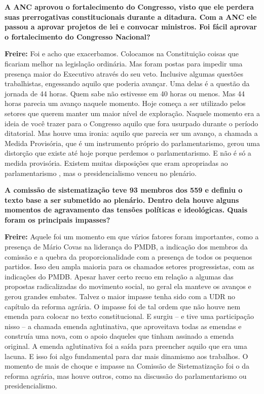 \textbf{A ANC aprovou o fortalecimento do Congresso, visto que ele
perdera suas prerrogativas constitucionais durante a ditadura. Com a ANC
ele passou a aprovar projetos de lei e convocar ministros. Foi fácil
aprovar o fortalecimento do Congresso Nacional?}

\textbf{Freire:} Foi e acho que exacerbamos. Colocamos na Constituição
coisas que ficariam melhor na legislação ordinária. Mas foram postas
para impedir uma presença maior do Executivo através do seu veto.
Inclusive algumas questões trabalhistas, engessando aquilo que poderia
avançar. Uma delas é a questão da jornada de 44 horas. Quem sabe não
estivesse em 40 horas ou menos. Mas 44 horas parecia um avanço naquele
momento. Hoje começa a ser utilizado pelos setores que querem manter um
maior nível de exploração. Naquele momento era a ideia de você trazer
para o Congresso aquilo que fora usurpado durante o período ditatorial.
Mas houve uma ironia: aquilo que parecia ser um avanço, a chamada a
Medida Provisória, que é um instrumento próprio do parlamentarismo,
gerou uma distorção que existe até hoje porque perdemos o
parlamentarismo. E não é só a medida provisória. Existem muitas
disposições que eram apropriadas ao parlamentarismo , mas o
presidencialismo venceu no plenário.

\textbf{A comissão de sistematização teve 93 membros dos 559 e definiu o
texto base a ser submetido ao plenário. Dentro dela houve alguns
momentos de agravamento das tensões políticas e ideológicas. Quais foram
os principais impasses?}

\textbf{Freire:} Aquele foi um momento em que vários fatores foram
importantes, como a presença de Mário Covas na liderança do PMDB, a
indicação dos membros da comissão e a quebra da proporcionalidade com a
presença de todos os pequenos partidos. Isso deu ampla maioria para os
chamados setores progressistas, com as indicações do PMDB. Apesar haver
certo recuo em relação a algumas das propostas radicalizadas do
movimento social, no geral ela manteve os avanços e gerou grandes
embates. Talvez o maior impasse tenha sido com a UDR no capítulo da
reforma agrária. O impasse foi de tal ordem que não houve nem emenda
para colocar no texto constitucional. E surgiu -- e tive uma
participação nisso -- a chamada emenda aglutinativa, que aproveitava
todas as emendas e construía uma nova, com o apoio daqueles que tinham
assinado a emenda original. A emenda aglutinativa foi a saída para
preencher aquilo que era uma lacuna. E isso foi algo fundamental para
dar mais dinamismo aos trabalhos. O momento de mais de choque e impasse
na Comissão de Sistematização foi o da reforma agrária, mas houve
outros, como na discussão do parlamentarismo ou presidencialismo.

